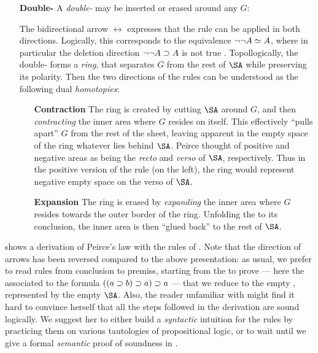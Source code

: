 \begin{itemize}
  \item[\textbf{Double-\kl{cut}}]
    A \emph{double-} may be inserted or erased around any  $G$:
    The bidirectional arrow $\leftrightarrow$ expresses that the rule can be
    applied in both directions.
    Logically, this corresponds to the  equivalence $\neg\neg A
    \simeq A$, where in particular the deletion direction $\neg\neg A \supset A$
    is not true . Topollogically, the double- forms a
    \emph{ring}, that separates $G$ from the rest of $\SA$ while preserving its
    polarity. Then the two directions of the rules can be understood as the
    following dual \emph{homotopies}:
    \begin{itemize}
      \item[\textbf{Contraction}] The ring is created by cutting $\SA$ around
      $G$, and then \emph{contracting} the inner area where $G$ resides on
      itself. This effectively ``pulls apart'' $G$ from the rest of the sheet,
      leaving apparent in the empty space of the ring whatever lies behind
      $\SA$. Peirce thought of positive and negative areas as being the
      \emph{recto} and \emph{verso} of $\SA$, respectively. Thus in the positive
      version of the rule (on the left), the ring would represent negative empty
      space on the verso of $\SA$.
      \item[\textbf{Expansion}] The ring is erased by \emph{expanding} the inner
      area where $G$ resides towards the outer border of the ring. Unfolding the
       to its conclusion, the inner area is then ``glued back'' to the
      rest of $\SA$.
    \end{itemize}
\end{itemize}

 shows a derivation of Peirce's law with the rules of
. Note that the direction of arrows has been reversed compared to the
above presentation: as usual, we prefer to read rules from conclusion to
premiss, starting from the  to prove --- here the  associated to the
formula $((a \supset b) \supset a) \supset a$ --- that we reduce to the empty ,
represented by the empty $\SA$. Also, the reader unfamiliar with  might find
it hard to convince herself that all the steps followed in the derivation are
sound logically. We suggest her to either build a \emph{syntactic} intuition for
the rules by practicing them on various tautologies of propositional logic, or
to wait until we give a formal \emph{semantic} proof of soundness in
.

